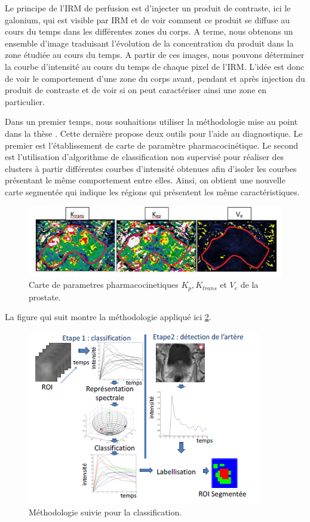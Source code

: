 Le principe de l'IRM de perfusion est d'injecter un produit de contraste, ici le galonium, qui est visible par IRM et de voir comment ce produit se diffuse au cours du temps dans les différentes zones du corps. A terme, nous obtenons un ensemble d'image traduisant l'évolution de la concentration du produit dans la zone étudiée au cours du temps. A partir de ces images, nous pouvons déterminer la courbe d'intensité au cours du temps de chaque pixel de l'IRM. L'idée est donc de voir le comportement d'une zone du corps avant, pendant et après injection du produit de contraste et de voir si on peut caractériser ainsi une zone en particulier.

Dans un premier temps, nous souhaitions utiliser la méthodologie mise au point dans la thèse \cite{tartare2014contribution}. Cette dernière propose deux outils pour l'aide au diagnostique. Le premier est l'établissement de carte de paramètre pharmacocinétique. Le second est l'utilisation d'algorithme de classification non supervisé pour réaliser des clusters à partir différentes courbes d'intensité obtenues afin d'isoler les courbes présentant le même comportement entre elles. Ainsi, on obtient une nouvelle carte segmentée qui indique les régions qui présentent les même caractéristiques.

\begin{figure}[H]
\centering
    \includegraphics[scale=0.6,angle=0]{Images/CatreDeParametresPharmacocinetique.png}
    \caption{Carte de parametres pharmacocinetiques $K_p, K_{trans}$ et $V_e$ de la prostate.}
    \label{fig:CarteDeParametresPharmacocinetique}
\end{figure}

La figure qui suit montre la méthodologie appliqué ici \ref{fig:Classif}.
 
\begin{figure}[H]
\centering
    \includegraphics[scale=1,angle=0]{Images/Classif.png}
    \caption{Méthodologie suivie pour la classification.}
    \label{fig:Classif}
\end{figure}

